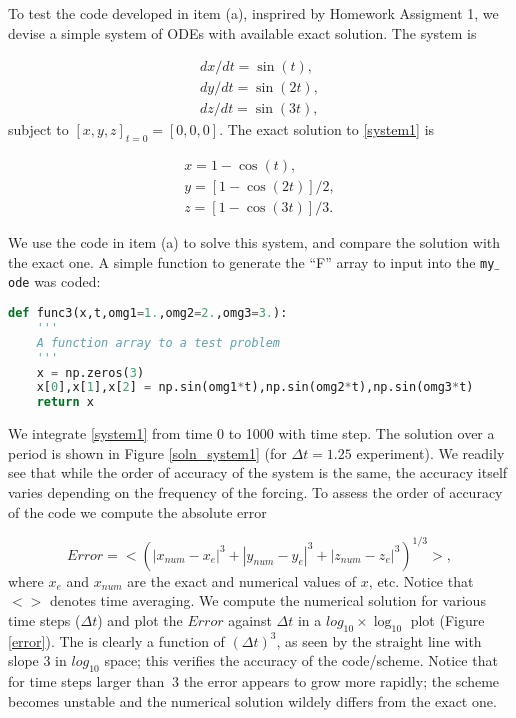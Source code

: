 \documentclass[11pt]{article}
\def\beq{\begin{equation}}
\def\eeq{\end{equation}}
\begin{document}
\begin{enumerate}[label=(\alph*)]
To test the code developed in item (a), insprired by Homework Assigment 1, we devise a simple system of ODEs with available exact solution. The system is

    \begin{align}
        \label{system1}
        d x/dt = \sin (t), \nonumber \\
        d y/dt = \sin (2 t), \nonumber \\
        d z/dt = \sin (3 t),
    \end{align}
    subject to $[x,y,z]_{t = 0} = [0,0,0]$. The exact solution to \eqref{system1} is

    \begin{align}
        x = 1 - \cos (t), \nonumber \\
        y = [1 - \cos (2 t)]/2, \nonumber \\
        z = [1-\cos (3 t)]/3.
    \end{align}

We use the code in item (a) to solve this system, and compare the solution with the exact one. A simple function to generate the ``F'' array to input into the \texttt{my$\_$ode} was coded:

\begin{lstlisting}[language=Python]
def func3(x,t,omg1=1.,omg2=2.,omg3=3.):
    '''
    A function array to a test problem
    '''
    x = np.zeros(3)
    x[0],x[1],x[2] = np.sin(omg1*t),np.sin(omg2*t),np.sin(omg3*t)
    return x
\end{lstlisting}

We integrate \eqref{system1} from time 0 to 1000 with time step. The solution over a period is shown in Figure \ref{soln_system1} (for $\Delta t = 1.25$ experiment). We readily see that while the order of accuracy of the system is the same, the accuracy itself varies depending on the frequency of the forcing. To assess the order of accuracy of the code we compute the absolute error

\beq
Error = <(|x_{num}-x_e|^3 + |y_{num}-y_e|^3 + |z_{num}-z_e|^3)^{1/3}>,
\eeq
where $x_e$ and $x_{num}$ are the exact and numerical values of $x$, etc. Notice that $< >$ denotes time averaging. We compute the numerical solution for various time steps ($\Delta t$) and plot the $Error$ against $\Delta t$ in a $log_{10}\times\log_{10}$ plot (Figure \ref{error}). The is clearly a function of $(\Delta t)^3$, as seen by the straight line with slope 3 in $log_10$ space; this verifies the accuracy of the code/scheme. Notice that for time steps larger than $~3$ the error appears to grow more rapidly; the scheme becomes unstable and the  numerical solution wildely differs from the exact one.




\end{enumerate}
\end{document}
